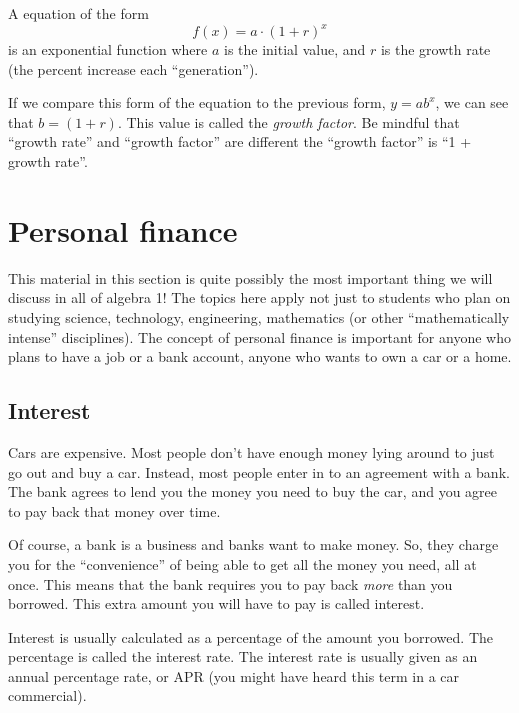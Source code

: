 \begin{boxeddef}
A equation of the form \[f(x) = a\cdot(1+r)^x\] is an exponential function where $a$ is the initial value, and $r$ is the growth rate (the percent increase each ``generation'').
\end{boxeddef}

If we compare this form of the equation to the previous form, $y=ab^x$, we can see that $b=(1+r)$. This value is called the \textit{growth factor}. Be mindful that ``growth rate'' and ``growth factor'' are different the ``growth factor'' is ``1 + growth rate''.


\section{Personal finance}
\label{sec:expofinance}

This material in this section is quite possibly the most important thing we will discuss in all of algebra 1! The topics here apply not just to students who plan on studying science, technology, engineering, mathematics (or other ``mathematically intense'' disciplines). The concept of personal finance is important for anyone who plans to have a job or a bank account, anyone who wants to own a car or a home.

\subsection{Interest}

Cars are expensive. Most people don't have enough money lying around to just go out and buy a car. Instead, most people enter in to an agreement with a bank. The bank agrees to lend you the money you need to buy the car, and you agree to pay back that money over time.

Of course, a bank is a business and banks want to make money. So, they charge you for the ``convenience'' of being able to get all the money you need, all at once. This means that the bank requires you to pay back \textit{more} than you borrowed. This extra amount you will have to pay is called \gls{interest}.

Interest is usually calculated as a percentage of the amount you borrowed. The percentage is called the \gls{interest rate}. The interest rate is usually given as an annual percentage rate, or APR (you might have heard this term in a car commercial).

